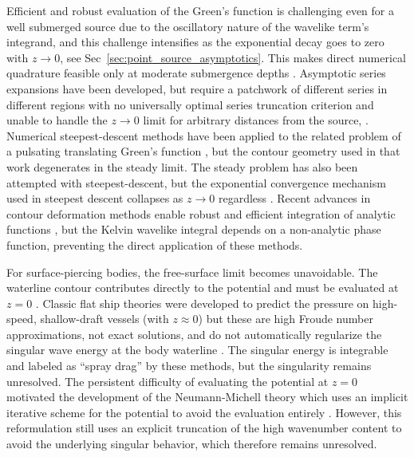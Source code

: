 \documentclass[]{JFM-FLM_Au}
\begin{document}
Efficient and robust evaluation of the Green's function is challenging even for a well submerged source due to the oscillatory nature of the wavelike term's integrand, and this challenge intensifies as the exponential decay goes to zero with $z\to 0$, see Sec~\ref{sec:point_source_asymptotics}. This makes direct numerical quadrature feasible only at moderate submergence depths \citep{furth_dissipative_2021}.  Asymptotic series expansions have been developed, but require a patchwork of different series in different regions with no universally optimal series truncation criterion and unable to handle the $z\to 0$ limit for arbitrary distances from the source, \citep{baar_evaluation_1988, clarisse_evaluation_1994}. Numerical steepest-descent methods have been applied to the related problem of a pulsating translating Green's function \citep{iwashita_green_1992}, but the contour geometry used in that work degenerates in the steady limit. The steady problem has also been attempted with steepest-descent, but the exponential convergence mechanism used in steepest descent collapses as $z\to 0$ regardless \citep{motygin_numerical_2017}. Recent advances in contour deformation methods enable robust and efficient integration of analytic functions \citep{gibbs_numerical_2024}, but the Kelvin wavelike integral depends on a non-analytic phase function, preventing the direct application of these methods.

For surface-piercing bodies, the free-surface limit becomes unavoidable. The waterline contour contributes directly to the potential and must be evaluated at $z=0$ \citep{baar_developments_1988}. Classic flat ship theories were developed to predict the pressure on high-speed, shallow-draft vessels (with $z\approx 0$) but these are high Froude number approximations, not exact solutions, and do not automatically regularize the singular wave energy at the body waterline \citep{tuck_low-aspect-ratio_1975,cole_simple_1988}. The singular energy is integrable and labeled as ``spray drag'' by these methods, but the singularity remains unresolved. The persistent difficulty of evaluating the potential at $z=0$ motivated the development of the Neumann-Michell theory which uses an implicit iterative scheme for the potential to avoid the evaluation entirely \citep{noblesse_neumannmichell_2013}. However, this reformulation still uses an explicit truncation of the high wavenumber content to avoid the underlying singular behavior, which therefore remains unresolved.
\end{document}
